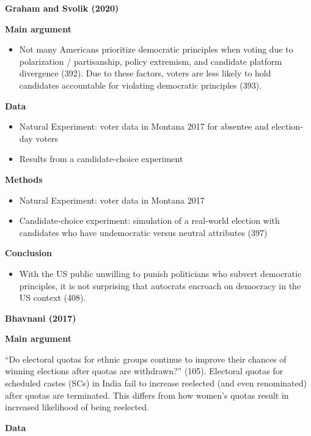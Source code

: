 \documentclass[
  english,
  man]{apa6}
\providecommand{\tightlist}{%
  \setlength{\itemsep}{0pt}\setlength{\parskip}{0pt}}
\begin{document}
\textbf{Graham and Svolik (2020)}

\textbf{Main argument}

\begin{itemize}
\tightlist
\item
  Not many Americans prioritize democratic principles when voting due to polarization / partisanship, policy extremism, and candidate platform divergence (392). Due to these factors, voters are less likely to hold candidates accountable for violating democratic principles (393).
\end{itemize}

\textbf{Data}

\begin{itemize}
\tightlist
\item
  Natural Experiment: voter data in Montana 2017 for absentee and election-day voters
\item
  Results from a candidate-choice experiment
\end{itemize}

\textbf{Methods}

\begin{itemize}
\tightlist
\item
  Natural Experiment: voter data in Montana 2017
\item
  Candidate-choice experiment: simulation of a real-world election with candidates who have undemocratic versus neutral attributes (397)
\end{itemize}

\textbf{Conclusion}

\begin{itemize}
\tightlist
\item
  With the US public unwilling to punish politicians who subvert democratic principles, it is not surprising that autocrats encroach on democracy in the US context (408).
\end{itemize}

\textbf{Bhavnani (2017)}

\textbf{Main argument}

``Do electoral quotas for ethnic groups continue to improve their chances of winning elections after quotas are withdrawn?'' (105). Electoral quotas for scheduled castes (SCs) in India fail to increase reelected (and even renominated) after quotas are terminated. This differs from how women's quotas result in increased likelihood of being reelected.

\textbf{Data}
\end{document}
